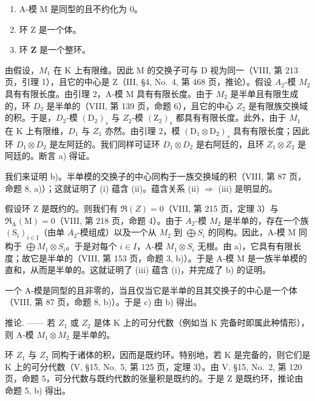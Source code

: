 \begin{enumerate}
\def\labelenumi{(\roman{enumi})}
\item
  A-模 M 是同型的且不约化为 0。
\item
  环 Z 是一个体。
\item
  环 \(\mathbf{Z}\) 是一个整环。
\end{enumerate}

由假设，\(M_{1}\) 在 K 上有限维。因此 M 的交换子可与 D 视为同一（VIII, 第 213 页，引理 1），且它的中心是 Z（III, §4, No.~4, 第 468 页，推论）。假设 \(A_{2}\)-模 \(M_{2}\) 具有有限长度。由引理 2，A-模 M 具有有限长度。由于 \(M_{2}\) 是半单且有限生成的，环 \(D_{2}\) 是半单的（VIII, 第 139 页，命题 6），且它的中心 \(Z_{2}\) 是有限族交换域的积。于是，\(D_{2}\)-模 \((\mathrm{D}_{2})_{s}\) 与 \(Z_{2}\)-模 \((\mathrm{Z}_{2})_{s}\) 都具有有限长度。此外，由于 \(M_{1}\) 在 K 上有限维，\(D_{1}\) 与 \(Z_{1}\) 亦然。由引理 2，模 \((\mathrm{D}_{1} \otimes \mathrm{D}_{2})_{s}\) 具有有限长度；因此环 \(D_{1} \otimes D_{2}\) 是左阿廷的。我们同样可证环 \(D_{1} \otimes D_{2}\) 是右阿廷的，且环 \(Z_{1} \otimes Z_{2}\) 是阿廷的。断言 a) 得证。

我们来证明 b)。半单模的交换子的中心同构于一族交换域的积（VIII, 第 87 页，命题 8, a)）；这就证明了 (i) 蕴含 (ii)。蕴含关系 (ii) \(\Rightarrow\) (iii) 是明显的。

假设环 Z 是既约的。则我们有 \(\Re(Z)=0\)（VIII, 第 215 页，定理 3）与 \(\Re_{\mathrm{A}}(\mathrm{M})=0\)（VIII, 第 218 页，命题 4）。由于 \(A_{2}\)-模 \(M_{2}\) 是半单的，存在一个族 \((\mathrm{S}_{i})_{i\in\mathrm{I}}\)（由单 \(A_{2}\)-模组成）以及一个从 \(M_{2}\) 到 \(\bigoplus S_{i}\) 的同构。因此，A-模 M 同构于 \(\bigoplus M_{1}\otimes S_{i}\)。于是对每个 \(i\in I\)，A-模 \(M_{1}\otimes S_{i}\) 无根。由 a)，它具有有限长度；故它是半单的（VIII, 第 153 页，命题 3, b)）。于是 A-模 M 是一族半单模的直和，从而是半单的。这就证明了 (iii) 蕴含 (i)，并完成了 b) 的证明。

一个 A-模是同型的且非零的，当且仅当它是半单的且其交换子的中心是一个体（VIII, 第 87 页，命题 8, b)）。于是 c) 由 b) 得出。

推论. —— 若 \(Z_{1}\) 或 \(Z_{2}\) 是体 K 上的可分代数（例如当 K 完备时即属此种情形），则 A-模 \(M_{1} \otimes M_{2}\) 是半单的。

环 \(Z_{1}\) 与 \(Z_{2}\) 同构于诸体的积，因而是既约环。特别地，若 K 是完备的，则它们是 K 上的可分代数（V, §15, No.~5, 第 125 页，定理 3）。由 V, §15, No.~2, 第 120 页，命题 5，可分代数与既约代数的张量积是既约的。于是 Z 是既约环，推论由命题 5, b) 得出。

